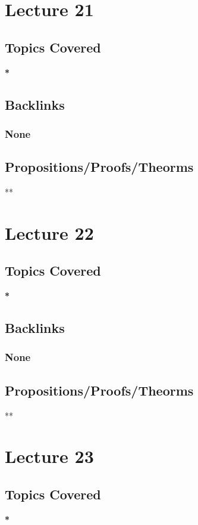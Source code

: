 \documentclass[11pt]{article}
\begin{document}
\section*{Lecture 21}
\label{sec:org75b4dce}
\subsection*{Topics Covered}
\label{sec:org3636d4c}
\textbf{*}
\subsection*{Backlinks}
\label{sec:orga7dbe79}
\subsubsection*{None}
\label{sec:org61dbfaf}
\subsection*{Propositions/Proofs/Theorms}
\label{sec:org8a0d744}
**

\section*{Lecture 22}
\label{sec:org61c9eda}
\subsection*{Topics Covered}
\label{sec:org0e74a28}
\textbf{*}
\subsection*{Backlinks}
\label{sec:orgc1c9381}
\subsubsection*{None}
\label{sec:org3d9ebcb}
\subsection*{Propositions/Proofs/Theorms}
\label{sec:orgce8496f}
**

\section*{Lecture 23}
\label{sec:org9b21164}
\subsection*{Topics Covered}
\label{sec:org14039a5}
\textbf{*}
\end{document}
